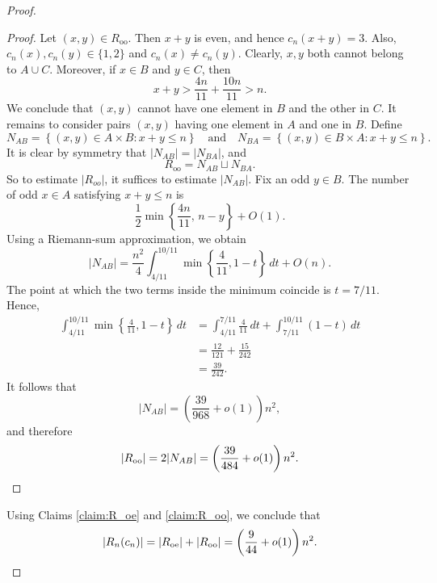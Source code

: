 \documentclass[10pt,a4paper]{amsart}
\begin{document}
\begin{proof}
\begin{proof} Let $(x,y)\in R_{\mathrm{oo}}$. Then $x+y$ is even, and hence $c_n(x+y) = 3$. Also, $c_n(x), c_n(y)\in \{1,2\}$ and $c_n(x)\neq c_n(y)$. Clearly, $x,y$ both cannot belong to $A\cup C$. Moreover, if $x\in B$ and $y\in C$, then
\[
x+y>
\frac{4n}{11}+\frac{10n}{11}>n.
\]
We conclude that $(x,y)$ cannot have one element in $B$ and the other in $C$. It remains to consider pairs $(x,y)$ having one element in $A$ and one in $B$. Define
\[
N_{AB}
=
\left\{(x,y)\in A\times B:x+y\leq n\right\} \quad \text{and}\quad N_{BA}
=
\left\{(x,y)\in B\times A:x+y\leq n\right\}.
\]
It is clear by symmetry that $|N_{AB}| = |N_{BA}|$, and
\[R_{\mathrm{oo}} = N_{AB}\sqcup N_{BA}.\]
So to estimate $|R_{oo}|$, it suffices to estimate $|N_{AB}|$. Fix an odd $y\in B$. The number of odd $x\in A$ satisfying
$x+y\leq n$ is
\[
\frac12
\min\left\{\frac{4n}{11},\,n-y\right\}+O(1).
\]
Using a Riemann-sum approximation, we obtain
\[
|N_{AB}|
=
\frac{n^2}{4}
\int_{4/11}^{10/11}
\min\left\{\frac{4}{11},1-t\right\}\,dt
+O(n).
\]
The point at which the two terms inside the minimum coincide is
$t=7/11$. Hence,
\[
\begin{aligned}
\int_{4/11}^{10/11}
\min\left\{\frac{4}{11},1-t\right\}\,dt
&=
\int_{4/11}^{7/11}\frac{4}{11}\,dt
+
\int_{7/11}^{10/11}(1-t)\,dt\\
&=
\frac{12}{121}+\frac{15}{242}\\
&=
\frac{39}{242}.
\end{aligned}
\]
It follows that
\[
|N_{AB}|
=
\left(\frac{39}{968}+o(1)\right)n^2,
\]
and therefore
\[
|R_{\mathrm{oo}}|
=
2|N_{AB}|
=
\left(\frac{39}{484}+o(1)\right)n^2.\qedhere
\]
\end{proof}
Using Claims \ref{claim:R_oe} and \ref{claim:R_oo}, we conclude that
\[    |R_n(c_n)| = |R_{\mathrm{oe}}|+|R_{\mathrm{oo}}| = \left(\frac{9}{44}+o(1)\right)n^2.\qedhere\]
\end{proof}
\end{document}
